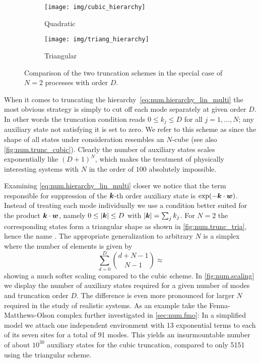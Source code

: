 \begin{figure}
  \centering
  \begin{subfigure}[b]{.4\columnwidth}
    \centering
    \texttt{[image: img/cubic\_hierarchy]}
    \caption{Quadratic}
    \label{fig:num.trunc_cubic}
  \end{subfigure}
  \begin{subfigure}[b]{.4\columnwidth}
    \centering
    \texttt{[image: img/triang\_hierarchy]}
    \caption{Triangular}
    \label{fig:num.trunc_tria}
  \end{subfigure}
  \caption{Comparison of the two truncation schemes in the special case of $N=2$ processes with order $D$.}
  \label{fig:num.trunc}
\end{figure}
When it comes to truncating the hierarchy~\ref{eq:num.hierarchy_lin_multi} the most obvious strategy is simply to cut off each mode separately at given order $D$.
In other words the truncation condition reads $0 \le k_j \le D$ for all $j=1,\dots,N$; any auxiliary state not satisfying it is set to zero.
We refer to this scheme as  since the shape of all states under consideration resembles an $N$-cube (see also \autoref{fig:num.trunc_cubic}).
Clearly the number of auxiliary states scales exponentially like $(D+1)^N$, which makes the treatment of physically interesting systems with $N$ in the order of $100$ absolutely impossible.

Examining \autoref{eq:num.hierarchy_lin_multi} closer we notice that the term responsible for suppression of the $\boldsymbol{k}$-th order auxiliary state is $\exp(-\kk \cdot \ww)$.
Instead of treating each mode individually we use a condition better suited for the product $\boldsymbol{k}\cdot\boldsymbol{w}$, namely $0 \le \left\vert \boldsymbol{k} \right\vert \le D$ with $\left\vert \boldsymbol{k} \right\vert = \sum_j k_j$.
For $N=2$ the corresponding states form a triangular shape as shown in \autoref{fig:num.trunc_tria}, hence the name .
The appropriate generalization to arbitrary $N$ is a simplex where the number of elements is given by
\begin{equation*}
  \sum_{d=0}^D {d + N - 1 \choose N - 1} \approx %
\end{equation*}
showing a much softer scaling compared to the cubic scheme.
In \autoref{fig:num.scaling} we display the number of auxiliary states required for a given number of modes and truncation order $D$.
The difference is even more pronounced for larger $N$ required in the study of realistic systems.
As an example take the Fenna-Matthews-Olson complex further investigated in \autoref{sec:num.fmo}:
In a simplified model we attach one independent environment with 13 exponential terms to each of its seven sites for a total of 91 modes.
This yields an insurmountable number of about $10^{30}$ auxiliary states for the cubic truncation, compared to only 5151 using the triangular scheme.

